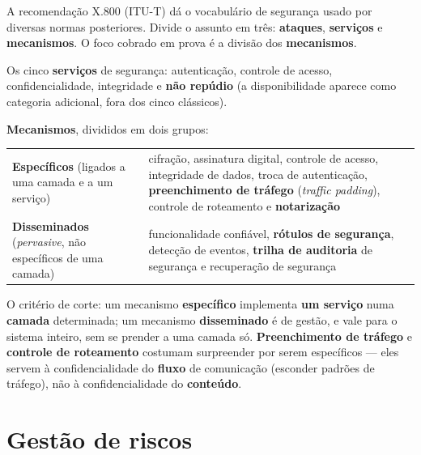 \begin{conceito}
A recomendação X.800 (ITU-T) dá o vocabulário de segurança usado por
diversas normas posteriores. Divide o assunto em três: \textbf{ataques},
\textbf{serviços} e \textbf{mecanismos}. O foco cobrado em prova é a
divisão dos \textbf{mecanismos}.

Os cinco \textbf{serviços} de segurança: autenticação, controle de
acesso, confidencialidade, integridade e \textbf{não repúdio} (a
disponibilidade aparece como categoria adicional, fora dos cinco
clássicos).

\textbf{Mecanismos}, divididos em dois grupos:

\begin{center}
\begin{tabular}{@{}p{3.4cm}p{8.6cm}@{}}
\toprule
\textbf{Específicos} (ligados a uma camada e a um serviço) & cifração,
assinatura digital, controle de acesso, integridade de dados, troca de
autenticação, \textbf{preenchimento de tráfego} (\textit{traffic
padding}), controle de roteamento e \textbf{notarização} \\
\textbf{Disseminados} (\textit{pervasive}, não específicos de uma camada)
& funcionalidade confiável, \textbf{rótulos de segurança}, detecção de
eventos, \textbf{trilha de auditoria} de segurança e recuperação de
segurança \\
\bottomrule
\end{tabular}
\end{center}

O critério de corte: um mecanismo \textbf{específico} implementa
\textbf{um serviço} numa \textbf{camada} determinada; um mecanismo
\textbf{disseminado} é de gestão, e vale para o sistema inteiro, sem se
prender a uma camada só. \textbf{Preenchimento de tráfego} e
\textbf{controle de roteamento} costumam surpreender por serem
específicos --- eles servem à confidencialidade do \textbf{fluxo} de
comunicação (esconder padrões de tráfego), não à confidencialidade do
\textbf{conteúdo}.
\end{conceito}

\section{Gestão de riscos}


